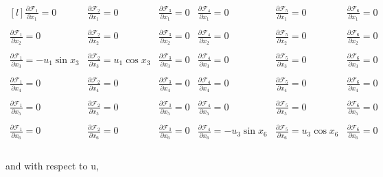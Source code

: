 \documentclass[paper=a4, fontsize=11pt]{scrartcl} %
\numberwithin{equation}{section} %
\numberwithin{figure}{section} %
\numberwithin{table}{section} %
\begin{document}
\begin{framed}
\[ \begin{matrix*}[l]
\frac{\partial\mathcal{F}_1}{\partial x_1} = 0 &
\frac{\partial\mathcal{F}_2}{\partial x_1} = 0 & 
\frac{\partial\mathcal{F}_3}{\partial x_1} = 0 & 
\frac{\partial\mathcal{F}_4}{\partial x_1} = 0 & 
\frac{\partial\mathcal{F}_5}{\partial x_1} = 0 &  
\frac{\partial\mathcal{F}_6}{\partial x_1} = 0 & \\ \\
\frac{\partial\mathcal{F}_1}{\partial x_2} = 0 &
\frac{\partial\mathcal{F}_2}{\partial x_2} = 0 & 
\frac{\partial\mathcal{F}_3}{\partial x_2} = 0 & 
\frac{\partial\mathcal{F}_4}{\partial x_2} = 0 & 
\frac{\partial\mathcal{F}_5}{\partial x_2} = 0 &  
\frac{\partial\mathcal{F}_6}{\partial x_2} = 0 & \\ \\
\frac{\partial\mathcal{F}_1}{\partial x_3} = -u_1\sin{x_3} &
\frac{\partial\mathcal{F}_2}{\partial x_3} = u_1\cos{x_3} & 
\frac{\partial\mathcal{F}_3}{\partial x_3} = 0 & 
\frac{\partial\mathcal{F}_4}{\partial x_3} = 0 & 
\frac{\partial\mathcal{F}_5}{\partial x_3} = 0 &  
\frac{\partial\mathcal{F}_6}{\partial x_3} = 0 & \\ \\
\frac{\partial\mathcal{F}_1}{\partial x_4} = 0 &
\frac{\partial\mathcal{F}_2}{\partial x_4} = 0 & 
\frac{\partial\mathcal{F}_3}{\partial x_4} = 0 & 
\frac{\partial\mathcal{F}_4}{\partial x_4} = 0 & 
\frac{\partial\mathcal{F}_5}{\partial x_4} = 0 &  
\frac{\partial\mathcal{F}_6}{\partial x_4} = 0 & \\ \\
\frac{\partial\mathcal{F}_1}{\partial x_5} = 0 &
\frac{\partial\mathcal{F}_2}{\partial x_5} = 0 & 
\frac{\partial\mathcal{F}_3}{\partial x_5} = 0 & 
\frac{\partial\mathcal{F}_4}{\partial x_5} = 0 & 
\frac{\partial\mathcal{F}_5}{\partial x_5} = 0 &  
\frac{\partial\mathcal{F}_6}{\partial x_5} = 0 & \\ \\
\frac{\partial\mathcal{F}_1}{\partial x_6} = 0 &
\frac{\partial\mathcal{F}_2}{\partial x_6} = 0 & 
\frac{\partial\mathcal{F}_3}{\partial x_6} = 0 & 
\frac{\partial\mathcal{F}_4}{\partial x_6} = -u_3\sin{x_6} & 
\frac{\partial\mathcal{F}_5}{\partial x_6} = u_3\cos{x_6} &  
\frac{\partial\mathcal{F}_6}{\partial x_6} = 0 & \\ \\
\end{matrix*}\]

and with respect to u,


\end{framed}
\end{document}
